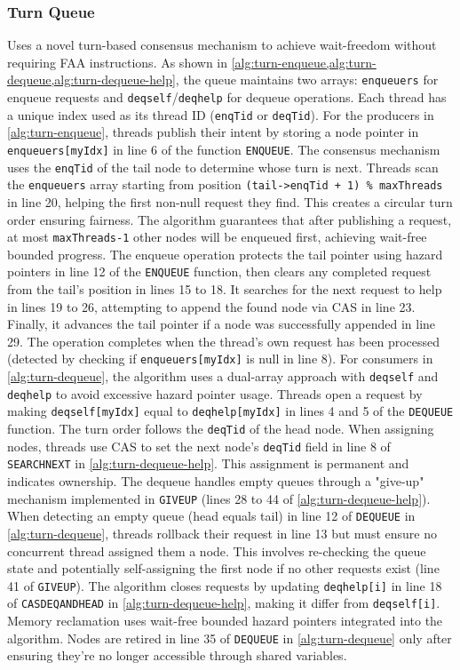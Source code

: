 \subsubsection{Turn Queue} 
Uses a novel turn-based consensus mechanism to achieve wait-freedom without requiring \ac{FAA} instructions. As shown in \cref{alg:turn-enqueue,alg:turn-dequeue,alg:turn-dequeue-help}, the queue maintains two arrays: \texttt{enqueuers} for enqueue requests and \texttt{deqself}/\texttt{deqhelp} for dequeue operations. Each thread has a unique index used as its thread ID (\texttt{enqTid} or \texttt{deqTid}). For the producers in \cref{alg:turn-enqueue}, threads publish their intent by storing a node pointer in \texttt{enqueuers[myIdx]} in line 6 of the function \texttt{ENQUEUE}. The consensus mechanism uses the \texttt{enqTid} of the tail node to determine whose turn is next. Threads scan the \texttt{enqueuers} array starting from position \texttt{(tail->enqTid + 1) \% maxThreads} in line 20, helping the first non-null request they find. This creates a circular turn order ensuring fairness. The algorithm guarantees that after publishing a request, at most \texttt{maxThreads-1} other nodes will be enqueued first, achieving wait-free bounded progress. The enqueue operation protects the tail pointer using hazard pointers in line 12 of the \texttt{ENQUEUE} function, then clears any completed request from the tail's position in lines 15 to 18. It searches for the next request to help in lines 19 to 26, attempting to append the found node via \ac{CAS} in line 23. Finally, it advances the tail pointer if a node was successfully appended in line 29. The operation completes when the thread's own request has been processed (detected by checking if \texttt{enqueuers[myIdx]} is null in line 8). For consumers in \cref{alg:turn-dequeue}, the algorithm uses a dual-array approach with \texttt{deqself} and \texttt{deqhelp} to avoid excessive hazard pointer usage. Threads open a request by making \texttt{deqself[myIdx]} equal to \texttt{deqhelp[myIdx]} in lines 4 and 5 of the \texttt{DEQUEUE} function. The turn order follows the \texttt{deqTid} of the head node. When assigning nodes, threads use \ac{CAS} to set the next node's \texttt{deqTid} field in line 8 of \texttt{SEARCHNEXT} in \cref{alg:turn-dequeue-help}. This assignment is permanent and indicates ownership. The dequeue handles empty queues through a "give-up" mechanism implemented in \texttt{GIVEUP} (lines 28 to 44 of \cref{alg:turn-dequeue-help}). When detecting an empty queue (head equals tail) in line 12 of \texttt{DEQUEUE} in \cref{alg:turn-dequeue}, threads rollback their request in line 13 but must ensure no concurrent thread assigned them a node. This involves re-checking the queue state and potentially self-assigning the first node if no other requests exist (line 41 of \texttt{GIVEUP}). The algorithm closes requests by updating \texttt{deqhelp[i]} in line 18 of \texttt{CASDEQANDHEAD} in \cref{alg:turn-dequeue-help}, making it differ from \texttt{deqself[i]}. Memory reclamation uses wait-free bounded hazard pointers integrated into the algorithm. Nodes are retired in line 35 of \texttt{DEQUEUE} in \cref{alg:turn-dequeue} only after ensuring they're no longer accessible through shared variables. 